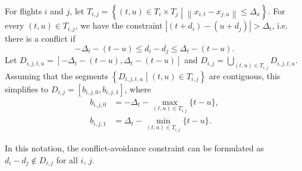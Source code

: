 \documentclass[twocolumn]{article}
\newcommand{\dmax}{d_{\max}}
\DeclareMathOperator*{\argmin}{arg\,min}
\begin{document}
For flights $i$ and $j$, let 
$T_{i,j} = 
\left\{(t, u) \in T_i \times T_j \middle| \left\|x_{i,t} - x_{j,u}\right\| \leq \Delta_x \right\}$.
For every $(t, u) \in T_{i, j}$, we have the constraint $|(t + d_i) - (u + d_j)| > \Delta_t$, 
i.e.
there is a conflict if 
\begin{equation}
- \Delta_t - (t - u) \leq d_i - d_j \leq \Delta_t - (t -u).
\end{equation}
Let 
$D_{i, j, t, u} = [- \Delta_t - (t -u), \Delta_t - (t -u)]$
and
$D_{i, j} = \bigcup_{(t, u) \in T_{i, j}} D_{i, j, t, u}$.
Assuming that the segments $\left\{D_{i, j, t, u} \middle| (t, u) \in T_{i, j}\right\}$ are contiguous, this simplifies to
$D_{i, j} = 
\left[b_{i, j, 0}, b_{i, j, 1}\right]$,
where
\begin{align}
b_{i, j, 0} &= -\Delta_t - \max_{(t, u) \in T_{i, j}} \{t -u\},\\
b_{i, j, 1} &= \Delta_t - \min_{(t, u) \in T_{i, j}} \{t -u\}.
\end{align}

In this notation, the conflict-avoidance constraint can be formulated as 
$d_i - d_j \notin D_{i, j}$ for all $i$, $j$.


%
\end{document}
